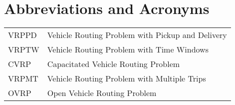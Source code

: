\chapter*{Abbreviations and Acronyms}


\noindent
\begin{longtable}{@{}p{}p{}@{}}
VRPPD & Vehicle Routing Problem with Pickup and Delivery \\
VRPTW & Vehicle Routing Problem with Time Windows \\ 
CVRP & Capacitated Vehicle Routing Problem \\ 
VRPMT & Vehicle Routing Problem with Multiple Trips \\ 
OVRP & Open Vehicle Routing Problem \\

\end{longtable}

